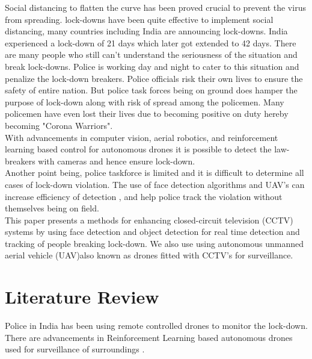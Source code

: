 \documentclass[10pt,twocolumn,letterpaper]{article}
\begin{document}
Social distancing to flatten the curve \cite{thunstrom2020benefits} has been proved crucial to prevent the virus from spreading. \cite{block2020social}
    lock-downs have been quite effective to implement social distancing, many countries including India are announcing lock-downs. India experienced a lock-down of 21 days which later got extended to 42 days. There are many people who still can't understand the seriousness of the situation and break lock-downs. Police is working day and night to cater to this situation and penalize the lock-down breakers. Police officials risk their own  lives to ensure the safety of entire nation. But police task forces being on ground does hamper the purpose of lock-down along with risk of spread among the policemen. Many policemen have even lost their lives due to becoming positive on duty hereby becoming "Corona Warriors". \\
    With advancements in computer vision, aerial robotics, and reinforcement learning based control for autonomous drones it is possible to detect the law-breakers with cameras and hence ensure lock-down. \\
    Another point being, police taskforce is limited and it is difficult to determine all cases of lock-down violation. 
    The use of face detection algorithms and UAV's can increase efficiency of detection , and help police track the violation without themselves being on field. \\
    This paper presents a methods for enhancing closed-circuit television (CCTV) systems by using face detection and object detection for real time detection and tracking of people breaking lock-down. We also use using autonomous unmanned aerial vehicle (UAV)also known as drones fitted with CCTV's  for surveillance.
    

\section{Literature Review}

Police in India has been using remote controlled drones to monitor the lock-down. There are advancements in Reinforcement Learning based autonomous drones used for surveillance of surroundings \cite{pham2018cooperative}.
\end{document}
